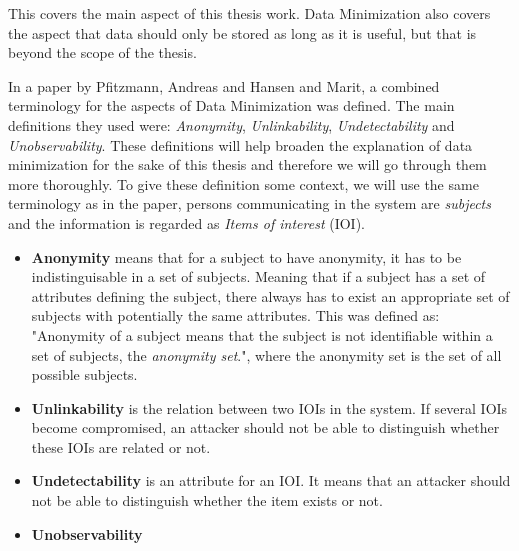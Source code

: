 This covers the main aspect of this thesis work. Data Minimization also covers the aspect that data should only be stored as long as it is useful, but that is beyond the scope of the thesis. 

In a paper by Pfitzmann, Andreas and Hansen and Marit, a combined terminology for the aspects of Data Minimization was defined. The main definitions they used were: \textit{Anonymity}, \textit{Unlinkability}, \textit{Undetectability} and \textit{Unobservability}.\cite{pfitzmann2010terminology} These definitions will help broaden the explanation of data minimization for the sake of this thesis and therefore we will go through them more thoroughly. To give these definition some context, we will use the same terminology as in the paper, persons communicating in the system are \textit{subjects} and the information is regarded as \textit{Items of interest} (IOI). %


\begin{itemize}
\item[] \textbf{Anonymity} means that for a subject to have anonymity, it has to be indistinguisable in a set of subjects. Meaning that if a subject has a set of attributes defining the subject, there always has to exist an appropriate set of subjects with potentially the same attributes. This was defined as: "Anonymity of a subject means that the subject is not identifiable within a set of subjects, the \textit{anonymity set}.", where the anonymity set is the set of all possible subjects. %

\item[] \textbf{Unlinkability} is the relation between two IOIs in the system. If several IOIs become compromised, an attacker should not be able to distinguish whether these IOIs are related or not. 

\item[] \textbf{Undetectability} is an attribute for an IOI. It means that an attacker should not be able to distinguish whether the item exists or not.

\item[] \textbf{Unobservability} 

\end{itemize}




